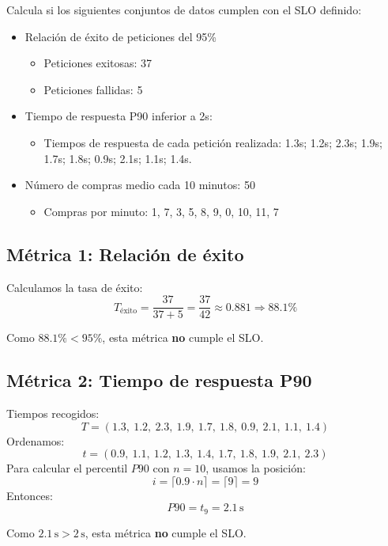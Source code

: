 \begin{enunciado}
    Calcula si los siguientes conjuntos de datos cumplen con el SLO definido:
    \begin{itemize}
        \item Relación de éxito de peticiones del 95\%
        \begin{itemize}
            \item Peticiones exitosas: 37
            \item Peticiones fallidas: 5
        \end{itemize}
        \item Tiempo de respuesta P90 inferior a 2s:
        \begin{itemize}
            \item Tiempos de respuesta de cada petición realizada: 1.3s; 1.2s; 2.3s; 1.9s; 1.7s; 1.8s; 0.9s; 2.1s; 1.1s; 1.4s.
        \end{itemize}
        \item Número de compras medio cada 10 minutos: 50
        \begin{itemize}
            \item Compras por minuto: 1, 7, 3, 5, 8, 9, 0, 10, 11, 7
        \end{itemize}
    \end{itemize}
\end{enunciado}

\subsection{Métrica 1: Relación de éxito}\label{subsec:metrica-1:-relacion-de-exito}
Calculamos la tasa de éxito:
\[
    T_{\text{éxito}} = \frac{37}{37 + 5} = \frac{37}{42} \approx 0.881 \Rightarrow 88.1\%
\]

\begin{solucion}[title=parte 1]
    Como $88.1\% < 95\%$, esta métrica \textbf{no} cumple el SLO\@.
\end{solucion}

\subsection{Métrica 2: Tiempo de respuesta P90}\label{subsec:metrica-2:-tiempo-de-respuesta-p90}
Tiempos recogidos:
\[
    T = (1.3,\ 1.2,\ 2.3,\ 1.9,\ 1.7,\ 1.8,\ 0.9,\ 2.1,\ 1.1,\ 1.4)
\]
Ordenamos:
\[
    t = (0.9,\ 1.1,\ 1.2,\ 1.3,\ 1.4,\ 1.7,\ 1.8,\ 1.9,\ 2.1,\ 2.3)
\]
Para calcular el percentil $P90$ con $n = 10$, usamos la posición:
\[
    i = \lceil 0.9 \cdot n \rceil = \lceil 9 \rceil = 9
\]
Entonces:
\[
    P90 = t_9 = 2.1\,\text{s}
\]
\begin{solucion}[title=parte 2]

    Como $2.1\,\text{s} > 2\,\text{s}$, esta métrica \textbf{no} cumple el SLO\@.
\end{solucion}

